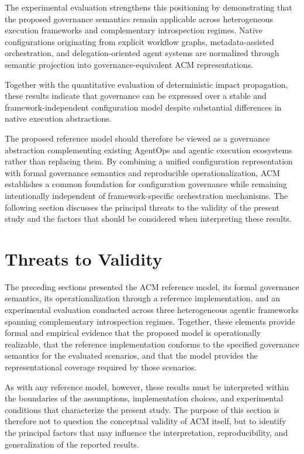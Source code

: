 \documentclass[10pt]{article}
\begin{document}
The experimental evaluation strengthens this positioning by demonstrating that the proposed governance semantics remain applicable across heterogeneous execution frameworks and complementary introspection regimes. Native configurations originating from explicit workflow graphs, metadata-assisted orchestration, and delegation-oriented agent systems are normalized through semantic projection into governance-equivalent ACM representations. 

Together with the quantitative evaluation of deterministic impact propagation, these results indicate that governance can be expressed over a stable and framework-independent configuration model despite substantial differences in native execution abstractions.

The proposed reference model should therefore be viewed as a governance abstraction complementing existing AgentOps and agentic execution ecosystems rather than replacing them. By combining a unified configuration representation with formal governance semantics and reproducible operationalization, ACM establishes a common foundation for configuration governance while remaining intentionally independent of framework-specific orchestration mechanisms. The following section discusses the principal threats to the validity of the present study and the factors that should be considered when interpreting these results.

\section{Threats to Validity}
\label{sec:threats_validity}

The preceding sections presented the ACM reference model, its formal governance semantics, its operationalization through a reference implementation, and an experimental evaluation conducted across three heterogeneous agentic frameworks spanning complementary introspection regimes. Together, these elements provide formal and empirical evidence that the proposed model is operationally realizable, that the reference implementation conforms to the specified governance semantics for the evaluated scenarios, and that the model provides the representational coverage required by those scenarios.

As with any reference model, however, these results must be interpreted within the boundaries of the assumptions, implementation choices, and experimental conditions that characterize the present study. The purpose of this section is therefore not to question the conceptual validity of ACM itself, but to identify the principal factors that may influence the interpretation, reproducibility, and generalization of the reported results.
\end{document}
